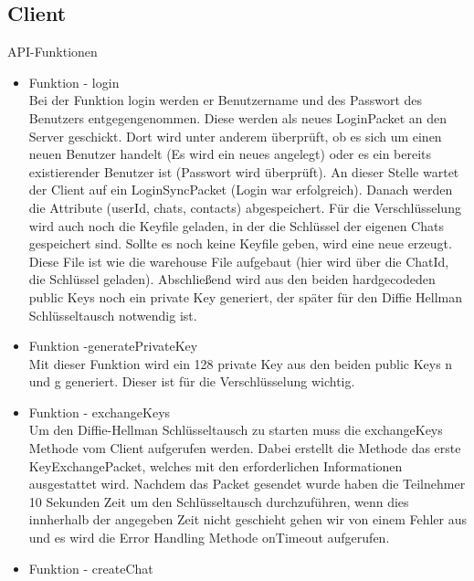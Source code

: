 \subsection{Client}
API-Funktionen
\begin{itemize}
    \item Funktion - login\\
    Bei der Funktion login werden er Benutzername und des Passwort des Benutzers entgegengenommen. Diese werden als
    neues LoginPacket an den Server geschickt. Dort wird unter anderem überprüft, ob es sich um einen neuen Benutzer
    handelt (Es wird ein neues angelegt) oder es ein bereits existierender Benutzer ist (Passwort wird überprüft).
    An dieser Stelle wartet der Client auf ein LoginSyncPacket (Login war erfolgreich). Danach werden die
    Attribute (userId, chats, contacts) abgespeichert. Für die Verschlüsselung wird auch noch die Keyfile geladen,
    in der die Schlüssel der eigenen Chats gespeichert sind. Sollte es noch keine Keyfile geben, wird eine neue
    erzeugt. Diese File ist wie die warehouse File aufgebaut (hier wird über die ChatId, die Schlüssel geladen).
    Abschließend wird aus den beiden hardgecodeden public Keys noch ein private Key generiert, der später für den
    Diffie Hellman Schlüsseltausch notwendig ist.
    
    \item Funktion -generatePrivateKey\\
    Mit dieser Funktion wird ein 128 private Key aus den beiden public Keys n und g generiert. Dieser ist für die
    Verschlüsselung wichtig.
    
    \item Funktion - exchangeKeys\\
    Um den Diffie-Hellman Schlüsseltausch zu starten muss die exchangeKeys Methode vom Client aufgerufen werden.
    Dabei erstellt die Methode das erste KeyExchangePacket, welches mit den erforderlichen Informationen
    ausgestattet wird. Nachdem das Packet gesendet wurde haben die Teilnehmer 10 Sekunden Zeit um den 
    Schlüsseltausch durchzuführen, wenn dies innherhalb der angegeben Zeit nicht geschieht gehen wir von
    einem Fehler aus und es wird die Error Handling Methode onTimeout aufgerufen.
    
    \item Funktion - createChat\\

\end{itemize}
